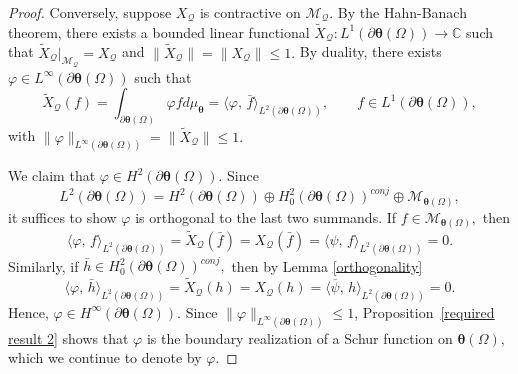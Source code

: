 \documentclass[12pt,reqno]{amsart}
\theoremstyle{remark}
\theoremstyle{definition}
\newcommand{\inp}[2]{\langle{#1},\,{#2} \rangle}
\begin{document}
\begin{proof}
Conversely, suppose $X_{\mathcal{Q}}$ is contractive on $\mathcal{M}_{\mathcal{Q}}.$ By the Hahn-Banach theorem, there exists a bounded linear functional $\widetilde{X}_{\mathcal{Q}}: L^1(\partial\boldsymbol\theta(\Omega))\to \mathbb C$ such that $\widetilde{X}_{\mathcal{Q}}|_{\mathcal{M}_{\mathcal{Q}}} = X_{\mathcal{Q}}$ and $\|\widetilde{X}_{\mathcal{Q}}\| = \|X_{\mathcal{Q}}\| \leq 1.$ 
By duality, %
there exists $\varphi \in L^\infty(\partial\boldsymbol\theta(\Omega))$ such that $$\widetilde{X}_{\mathcal{Q}}(f) = \int_{\partial\boldsymbol\theta(\Omega)} \varphi f d\mu_{\boldsymbol \theta}=\inp{\varphi}{\bar{f}}_{L^2(\partial\boldsymbol\theta(\Omega))}, \qquad f \in L^1(\partial\boldsymbol\theta(\Omega)),$$
with $\|\varphi\|_{L^\infty(\partial\boldsymbol\theta(\Omega))} = \|\widetilde{X}_{\mathcal{Q}}\| \leq 1.$

We claim that $\varphi\in H^2(\partial\boldsymbol\theta(\Omega)).$ Since $$L^2(\partial\boldsymbol\theta(\Omega)) = H^2(\partial\boldsymbol\theta(\Omega)) \oplus H^2_0(\partial\boldsymbol\theta(\Omega))^{conj} \oplus \mathcal{M}_{\boldsymbol\theta(\Omega)},$$ it suffices to show $\varphi$ is orthogonal to the last two summands. If $f\in \mathcal{M}_{\boldsymbol\theta(\Omega)},$ then 
$$ \inp{\varphi}{f}_{L^2(\partial\boldsymbol\theta(\Omega))} = \widetilde{X}_{\mathcal{Q}}(\bar{f}) = X_{\mathcal{Q}}(\bar{f}) =  \inp{\psi}{f}_{L^2(\partial\boldsymbol\theta(\Omega))} = 0. $$
Similarly, if $\bar{h}\in H^2_0(\partial\boldsymbol\theta(\Omega))^{conj},$ then by Lemma \ref{orthogonality}
$$ \inp{\varphi}{\bar{h}}_{L^2(\partial\boldsymbol\theta(\Omega))} = \widetilde{X}_{\mathcal{Q}}(h) = X_{\mathcal{Q}}(h) = \overline{\inp{\overline{\psi}}{h}_{L^2(\partial\boldsymbol\theta(\Omega))}} = 0. $$
 Hence, $\varphi \in H^\infty(\partial\boldsymbol\theta(\Omega)).$ Since $\|\varphi\|_{L^\infty(\partial\boldsymbol\theta(\Omega))}\leq 1$, Proposition~\ref{required result 2} shows that $\varphi$ is the boundary realization of a Schur function on $\boldsymbol\theta(\Omega),$ which we continue to denote by $\varphi.$ 


\end{proof}
\end{document}
